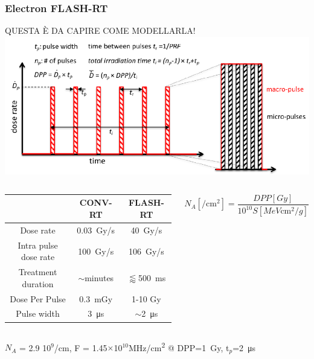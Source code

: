     \begin{frame}
        \frametitle{Electron FLASH-RT}
        QUESTA È DA CAPIRE COME MODELLARLA! 
        \centering
        \includegraphics[width=0.8\linewidth]{figures/test_beam/beam_structure.pdf}
        \begin{columns}
                \begin{table}
                    \tiny
                    \begin{center}
                    \begin{tabular}{|c | c |c |}
                    \hline
                    & CONV-RT & FLASH-RT \\
                    \hline
                    \hline
                    Dose rate & \SI{0.03}{Gy/s} & \SI{40}{Gy/s}\\
                    Intra pulse dose rate & \SI{100}{Gy/s}&\SI{10 6}{Gy/s}\\
                    Treatment duration & $\sim$minutes & $\lessapprox$\SI{500}{ms} \\
                    Dose Per Pulse & \SI{0.3}{mGy} & 1-10 Gy\\
                    Pulse width & \SI{3}{\us} & $\sim$\SI{2}{\us} \\
                    \hline
                    \end{tabular}
                    \end{center}
                \end{table}    
                \begin{equation*}
                    N_A[/\si{\cm\squared}] = \frac{DPP[Gy]}{10^{10} S[\si{MeV \cm \squared /g}]}
                \end{equation*}
        \end{columns}
        $N_A$ = 2.9 10$^9$/cm, F = 1.45$\times$10$^{10}$\si{MHz/cm\squared} @  DPP=\SI{1}{Gy}, t$_p$=\SI{2}{\us}
    \end{frame}     


